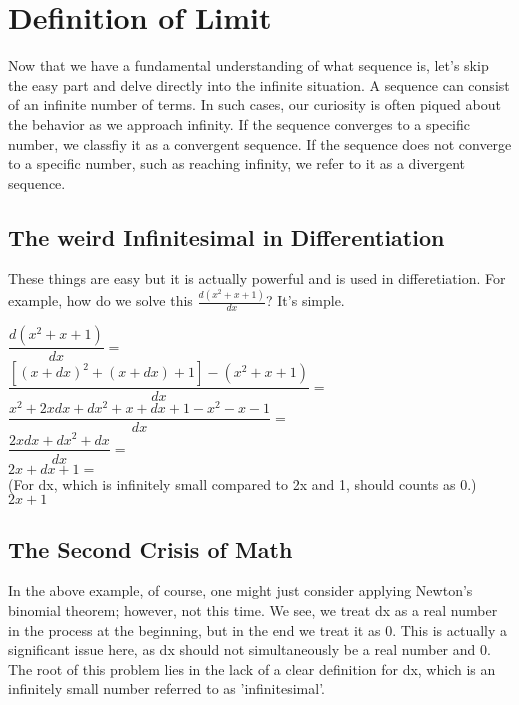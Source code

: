 \documentclass{article}
\begin{document}
  \section{Definition of Limit}
  Now that we have a fundamental understanding of what sequence is, let's skip the easy part and delve directly into the infinite situation. A sequence can consist of an infinite number of terms. In such cases, our curiosity is often piqued about the behavior as we approach infinity. If the sequence converges to a specific number, we classfiy it as a convergent sequence. If the sequence does not converge to a specific number, such as reaching infinity, we refer to it as a divergent sequence.  \\
  
  \subsection{The weird Infinitesimal in Differentiation}
  These things are easy but it is actually powerful and is used in differetiation. For example, how do we solve this $\frac{d(x^2+x+1)}{dx}$?  It's simple. \\

  \begin{center}
	  $\dfrac{d(x^2+x+1)}{dx} =$ \\[1ex] 
	  $\dfrac{[(x+dx)^2+(x+dx)+1]-(x^2+x+1)}{dx} =$ \\[1ex]
	  $\dfrac{x^2+2xdx+dx^2+x+dx+1-x^2-x-1}{dx} =$  \\[1ex]
	  $\dfrac{2xdx+dx^2+dx}{dx} =$ \\[1ex]
	  $2x+dx+1 =$ \\[1ex]
	  (For dx, which is infinitely small compared to 2x and 1, should counts as 0.) \\[1ex]
	  $2x+1$ \\[1ex] 
  \end{center}

  \subsection{The Second Crisis of Math}

  In the above example, of course, one might just consider applying Newton's binomial theorem; however, not this time. We see, we treat dx as a real number in the process at the beginning, but in the end we treat it as 0. This is actually a significant issue here, as dx should not simultaneously be a real number and 0. The root of this problem lies in the lack of a clear definition for dx, which is an infinitely small number referred to as 'infinitesimal'. \\
\end{document}
